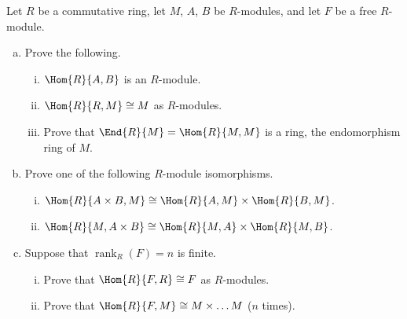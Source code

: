 \documentclass[10pt]{amsart}
\begin{document}
\begin{thm}
  Let $R$ be a commutative ring, let $M$, $A$, $B$ be $R$-modules, and let $F$ be a free $R$-module.
  \begin{enumerate}[(a)]
  \item
    Prove the following.
    \begin{enumerate}[(i)]
    \item
      $\Hom{R}{A,B}$ is an $R$-module.
    \item
      $\Hom{R}{R,M} \cong M$ as $R$-modules.
    \item
      Prove that $\End{R}{M} = \Hom{R}{M,M}$ is a ring, the endomorphism ring of $M$.
  \end{enumerate}
\item
  Prove one of the following $R$-module isomorphisms.
  \begin{enumerate}[(i)]
  \item
    $\Hom{R}{A \times B, M} \cong \Hom{R}{A,M} \times \Hom{R}{B,M}$.
  \item
    $\Hom{R}{M, A \times B} \cong \Hom{R}{M,A} \times \Hom{R}{M,B}$.
  \end{enumerate}
\item
  Suppose that $\operatorname{rank}_R(F) = n$ is finite.
  \begin{enumerate}[(i)]
  \item
    Prove that $\Hom{R}{F,R} \cong F$ as $R$-modules.
  \item
    Prove that $\Hom{R}{F,M} \cong M \times \ldots M$ ($n$ times).
  \end{enumerate}
\end{enumerate}


\end{thm}
\end{document}
